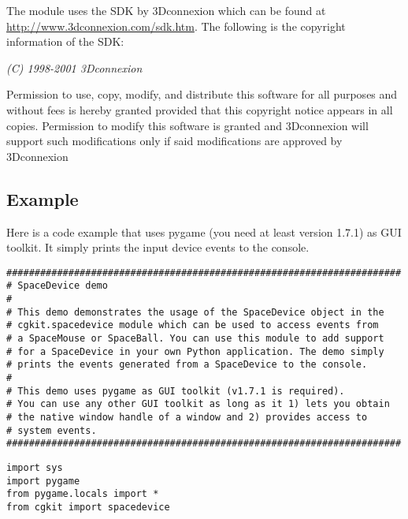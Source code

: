 \begin{notice}[note]
The module uses the SDK by 3Dconnexion which can be found at 
\url{http://www.3dconnexion.com/sdk.htm}. The following is the
copyright information of the SDK:

{\em (C) 1998-2001 3Dconnexion 

Permission to use, copy, modify, and distribute this software for all
purposes and without fees is hereby granted provided that this
copyright notice appears in all copies. Permission to modify this
software is granted and 3Dconnexion will support such modifications
only if said modifications are approved by 3Dconnexion}
\end{notice}

\subsection{Example}

Here is a code example that uses pygame (you need at least version 1.7.1)
as GUI toolkit. It simply prints the input device events to the console.

\begin{verbatim}
######################################################################
# SpaceDevice demo
#
# This demo demonstrates the usage of the SpaceDevice object in the
# cgkit.spacedevice module which can be used to access events from
# a SpaceMouse or SpaceBall. You can use this module to add support
# for a SpaceDevice in your own Python application. The demo simply
# prints the events generated from a SpaceDevice to the console.
#
# This demo uses pygame as GUI toolkit (v1.7.1 is required).
# You can use any other GUI toolkit as long as it 1) lets you obtain
# the native window handle of a window and 2) provides access to
# system events.
######################################################################
\end{verbatim}

\begin{verbatim}
import sys
import pygame
from pygame.locals import *
from cgkit import spacedevice
\end{verbatim}

